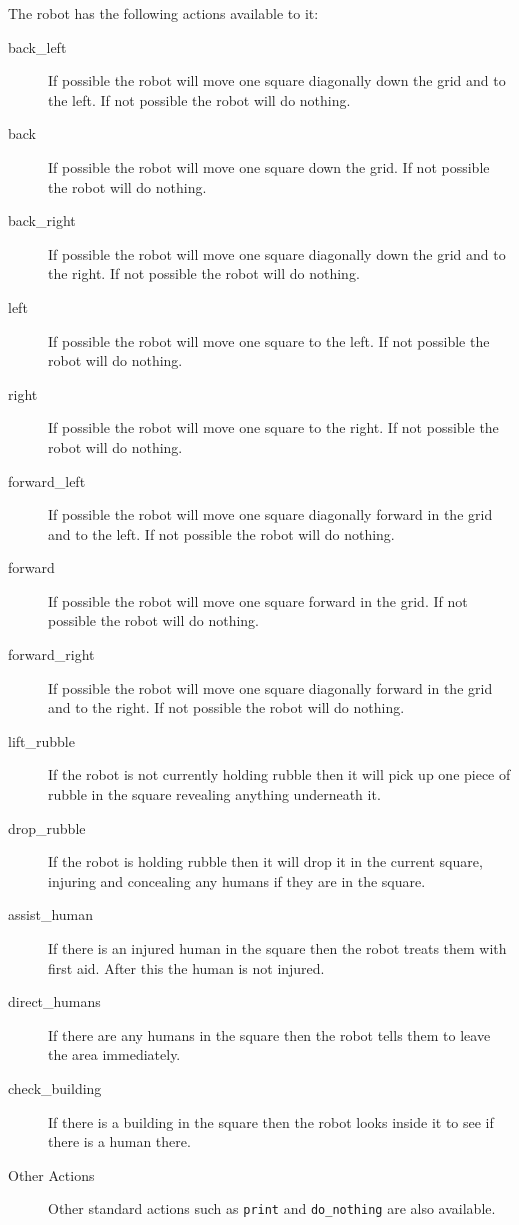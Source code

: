 The robot  has the following actions available to it:
\begin{description}
\item[back\_left] If possible the robot will move one square diagonally down the grid and to the left.  If not possible the robot will do nothing.
\item[back] If possible the robot will move one square down the grid.  If not possible the robot will do nothing.
\item[back\_right] If possible the robot will move one square diagonally down the grid and to the right.  If not possible the robot will do nothing.
\item[left] If possible the robot will move one square to the left.  If not possible the robot will do nothing.
\item[right] If possible the robot will move one square to the right.  If not possible the robot will do nothing.
\item[forward\_left] If possible the robot will move one square diagonally forward in the grid and to the left.  If not possible the robot will do nothing.
\item[forward] If possible the robot will move one square forward in the grid.  If not possible the robot will do nothing.
\item[forward\_right] If possible the robot will move one square diagonally forward in the grid and to the right.  If not possible the robot will do nothing.
\item[lift\_rubble] If the robot is not currently holding rubble then it will pick up one piece of rubble in the square revealing anything underneath it.
\item[drop\_rubble] If the robot is holding rubble then it will drop it in the current square, injuring and concealing any humans if they are in the square.
\item[assist\_human] If there is an injured human in the square then the robot treats them with first aid.  After this the human is not injured.
\item[direct\_humans] If there are any humans in the square then the robot tells them to leave the area immediately.
\item[check\_building] If there is a building in the square then the robot looks inside it to see if there is a human there.
\item[Other Actions] Other standard actions such as \texttt{print} and \texttt{do\_nothing} are also available.
\end{description}


